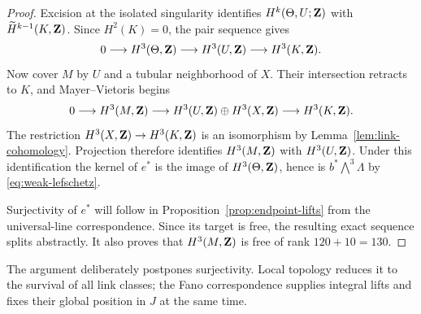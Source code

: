 \begin{proof}
Excision at the isolated singularity identifies
\(H^k(\Theta,U;\mathbf Z)\) with \(\widetilde H^{k-1}(K,\mathbf Z)\).  Since
\(H^2(K)=0\), the pair sequence gives
\begin{equation}\label{eq:theta-pair}
 0\longrightarrow H^3(\Theta,\mathbf Z)
 \longrightarrow H^3(U,\mathbf Z)
 \longrightarrow H^3(K,\mathbf Z).
\end{equation}
Now cover \(M\) by \(U\) and a tubular neighborhood of \(X\).  Their
intersection retracts to \(K\), and Mayer--Vietoris begins
\[
 0\longrightarrow H^3(M,\mathbf Z)
 \longrightarrow H^3(U,\mathbf Z)\oplus H^3(X,\mathbf Z)
 \longrightarrow H^3(K,\mathbf Z).
\]
The restriction \(H^3(X,\mathbf Z)\to H^3(K,\mathbf Z)\) is an isomorphism by
Lemma~\ref{lem:link-cohomology}.  Projection therefore identifies
\(H^3(M,\mathbf Z)\) with \(H^3(U,\mathbf Z)\).  Under this identification the kernel of
\(e^*\) is the image of \(H^3(\Theta,\mathbf Z)\), hence is
\(b^*\bigwedge^3\Lambda\) by \eqref{eq:weak-lefschetz}.

Surjectivity of \(e^*\) will follow in
Proposition~\ref{prop:endpoint-lifts} from the universal-line
correspondence.  Since its target is free, the resulting exact sequence
splits abstractly.  It also proves that \(H^3(M,\mathbf Z)\) is free of rank
\(120+10=130\).
\end{proof}

The argument deliberately postpones surjectivity.  Local topology reduces
it to the survival of all link classes; the Fano correspondence supplies
integral lifts and fixes their global position in \(J\) at the same time.
